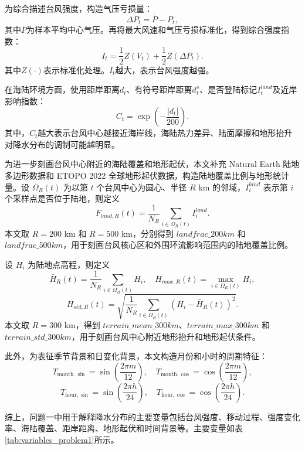 \documentclass[UTF8,a4paper,zihao=5,fontset=fandol]{ctexart}
\numberwithin{equation}{section}
\numberwithin{figure}{section}
\numberwithin{table}{section}
\begin{document}
为综合描述台风强度，构造气压亏损量：
\begin{equation}
    \Delta P_t=\bar{P}-P_t,
\end{equation}
其中$\bar{P}$为样本平均中心气压。再将最大风速和气压亏损标准化，得到综合强度指数：
\begin{equation}
    I_t=\frac{1}{2}Z(V_t)+\frac{1}{2}Z(\Delta P_t).
\end{equation}
其中$Z(\cdot)$表示标准化处理。$I_t$越大，表示台风强度越强。

在海陆环境方面，使用距岸距离$d_t$、有符号距岸距离$d_t^s$、是否登陆标记$I_t^{land}$及近岸影响指数：
\begin{equation}
    C_t=\exp\left(-\frac{|d_t|}{200}\right).
\end{equation}
其中，$C_t$越大表示台风中心越接近海岸线，海陆热力差异、陆面摩擦和地形抬升对降水分布的调制可能越明显。

为进一步刻画台风中心附近的海陆覆盖和地形起伏，本文补充 Natural Earth 陆地多边形数据和 ETOPO 2022 全球地形起伏数据，构造陆地覆盖比例与地形统计量。设 $\Omega_R(t)$ 为以第 $t$ 个台风中心为圆心、半径 $R$ km 的邻域，$I_i^{land}$ 表示第 $i$ 个采样点是否位于陆地，则定义
\[
F_{land,R}(t)=\frac{1}{N_R}\sum_{i\in\Omega_R(t)}I_i^{land}.
\]
本文取 $R=200$ km 和 $R=500$ km，分别得到 $landfrac\_200km$ 和 $landfrac\_500km$，用于刻画台风核心区和外围环流影响范围内的陆地覆盖比例。

设 $H_i$ 为陆地点高程，则定义
\[
\bar H_R(t)=\frac{1}{N_R}\sum_{i\in\Omega_R(t)}H_i,\quad
H_{max,R}(t)=\max_{i\in\Omega_R(t)}H_i,
\]
\[
H_{std,R}(t)=
\sqrt{\frac{1}{N_R}\sum_{i\in\Omega_R(t)}(H_i-\bar H_R(t))^2}.
\]
本文取 $R=300$ km，得到 $terrain\_mean\_300km$、$terrain\_max\_300km$ 和 $terrain\_std\_300km$，用于刻画台风中心附近地形抬升和地形起伏条件。

此外，为表征季节背景和日变化背景，本文构造月份和小时的周期特征：
\begin{equation}
    T_{\mathrm{month},\sin}=\sin\left(\frac{2\pi m}{12}\right),\quad
    T_{\mathrm{month},\cos}=\cos\left(\frac{2\pi m}{12}\right),
\end{equation}
\begin{equation}
    T_{\mathrm{hour},\sin}=\sin\left(\frac{2\pi h}{24}\right),\quad
    T_{\mathrm{hour},\cos}=\cos\left(\frac{2\pi h}{24}\right).
\end{equation}

综上，问题一中用于解释降水分布的主要变量包括台风强度、移动过程、强度变化率、海陆覆盖、距岸距离、地形起伏和时间背景等。主要变量如表\ref{tab:variables_problem1}所示。
\end{document}

